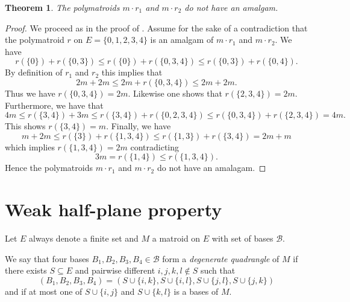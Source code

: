 \documentclass[11pt]{article}
\newtheorem{thm}[theo]{Theorem}
\theoremstyle{definition}
\numberwithin{equation}{section}
\newcommand{\cB}{{\mathcal B}}
\begin{document}
\begin{thm}
    The polymatroids $m\cdot r_1$ and $m\cdot r_2$ do not have an amalgam.
\end{thm}

\begin{proof}
    We proceed as in the proof of \cite[Theorem~2]{sticky}.
    Assume for the sake of a contradiction that the polymatroid $r$ on $E=\{0,1,2,3,4\}$ is an amalgam of $m\cdot r_1$ and $m\cdot r_2$. We have
    \begin{equation*}
        r(\{0\})+r(\{0,3\})\leq r(\{0\})+r(\{0,3,4\})\leq r(\{0,3\})+r(\{0,4\}).
    \end{equation*}
    By definition of $r_1$ and $r_2$ this implies that
    \begin{equation*}
        2m+2m\leq 2m+r(\{0,3,4\})\leq 2m+2m.
    \end{equation*}
    Thus we have $r(\{0,3,4\})=2m$. Likewise one shows that $r(\{2,3,4\})=2m$. Furthermore, we have that
    \begin{equation*}
      4m\leq r(\{3,4\})+3m \leq r(\{3,4\})+r(\{0,2,3,4\})\leq r(\{0,3,4\})+r(\{2,3,4\})=4m.
    \end{equation*}
    This shows $r(\{3,4\})=m$. Finally, we have
    \begin{equation*}
      m+2m\leq  r(\{3\})+r(\{1,3,4\}) \leq r(\{1,3\})+r(\{3,4\}) =2m+m
    \end{equation*}
    which implies $r(\{1,3,4\})=2m$ contradicting
    \begin{equation*}
        3m=r(\{1,4\})\leq r(\{1,3,4\}).
     \end{equation*}
     Hence the polymatroids $m\cdot r_1$ and $m\cdot r_2$ do not have an amalagam.
\end{proof}

\section{Weak half-plane property}\label{sec:whpp}
Let $E$ always denote a finite set and $M$ a matroid on $E$ with set of bases $\cB$.

\begin{Def}
    We say that four bases $B_1,B_2,B_3,B_4\in\cB$ form a \emph{degenerate quadrangle} of $M$ if there exists $S\subseteq E$ and pairwise different $i,j,k,l\notin S$ such that 
    \begin{equation*}
      (B_1,B_2,B_3,B_4)=(S\cup\{i,k\},S\cup\{i,l\},S\cup\{j,l\},S\cup\{j,k\})  
    \end{equation*}
    and if at most one of $S\cup\{i,j\}$ and $S\cup\{k,l\}$ is a bases of $M$. 
\end{Def}
\end{document}
